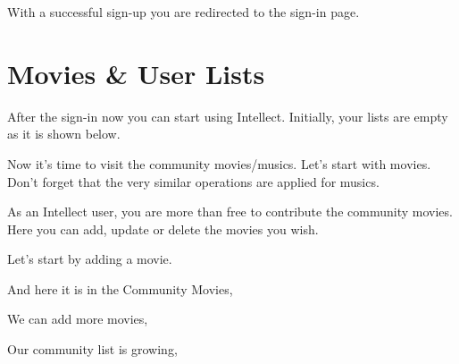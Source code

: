 \documentclass[letterpaper,10pt,english]{sphinxmanual}
\begin{document}
With a successful sign-up you are redirected to the sign-in page.

\begin{figure}[htbp]
\centering

\noindent{}
\end{figure}


\section{Movies \& User Lists}
\label{\detokenize{user/index:movies-user-lists}}
After the sign-in now you can start using Intellect. Initially, your lists are empty as it is shown below.

\begin{figure}[htbp]
\centering

\noindent{}
\end{figure}

Now it’s time to visit the community movies/musics. Let’s start with movies. Don’t forget that the very similar operations
are applied for musics.

As an Intellect user, you are more than free to contribute the community movies.
Here you can add, update or delete the movies you wish.

Let’s start by adding a movie.

\begin{figure}[htbp]
\centering

\noindent{}
\end{figure}

And here it is in the Community Movies,

\begin{figure}[htbp]
\centering

\noindent{}
\end{figure}

We can add more movies,

\begin{figure}[htbp]
\centering

\noindent{}
\end{figure}

Our community list is growing,
\begin{quote}

\begin{figure}[htbp]
\centering

\noindent{}
\end{figure}
\end{quote}
\end{document}
